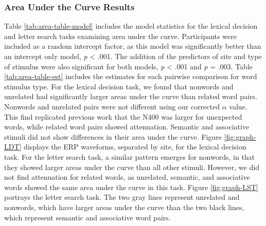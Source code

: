 \documentclass[english,man]{apa6}
\theoremstyle{definition}
\theoremstyle{definition}
\theoremstyle{definition}
\theoremstyle{remark}
\begin{document}
\subsubsection{Area Under the Curve
Results}\label{area-under-the-curve-results}

Table \ref{tab:area-table-model} includes the model statistics for the
lexical decision and letter search tasks examining area under the curve.
Participants were included as a random intercept factor, as this model
was significantly better than an intercept only model, \emph{p}
\textless{} .001. The addition of the predictors of site and type of
stimulus were also significant for both models, \emph{p} \textless{}
.001 and \emph{p} = .003. Table \ref{tab:area-table-est} includes the
estimates for each pairwise comparison for word stimulus type. For the
lexical decision task, we found that nonwords and unrelated had
significantly larger areas under the curve than related word pairs.
Nonwords and unrelated pairs were not different using our corrected
\(\alpha\) value. This find replicated previous work that the N400 was
larger for unexpected words, while related word pairs showed
attenuation. Semantic and associative stimuli did not show differences
in their area under the curve. Figure \ref{fig:graph-LDT} displays the
ERP waveforms, separated by site, for the lexical decision task. For the
letter search task, a similar pattern emerges for nonwords, in that they
showed larger areas under the curve than all other stimuli. However, we
did not find attenuation for related words, as unrelated, semantic, and
associative words showed the same area under the curve in this task.
Figure \ref{fig:graph-LST} portrays the letter search task. The two gray
lines represent unrelated and nonwords, which have larger areas under
the curve than the two black lines, which represent semantic and
associative word pairs.
\end{document}
